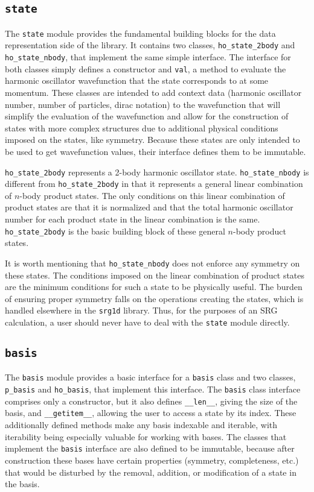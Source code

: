 \subsection{\texttt{state}}

The \texttt{state} module provides the fundamental building blocks for the data representation side of the library. It contains two classes, \texttt{ho\_state\_2body} and \texttt{ho\_state\_nbody}, that implement the same simple interface. The interface for both classes simply defines a constructor and \texttt{val}, a method to evaluate the harmonic oscillator wavefunction that the state corresponds to at some momentum. These classes are intended to add context data (harmonic oscillator number, number of particles, dirac notation) to the wavefunction that will simplify the evaluation of the wavefunction and allow for the construction of states with more complex structures due to additional physical conditions imposed on the states, like symmetry. Because these states are only intended to be used to get wavefunction values, their interface defines them to be immutable.

\texttt{ho\_state\_2body} represents a 2-body harmonic oscillator state. \texttt{ho\_state\_nbody} is different from \texttt{ho\_state\_2body} in that it represents a general linear combination of $n$-body product states. The only conditions on this linear combination of product states are that it is normalized and that the total harmonic oscillator number for each product state in the linear combination is the same. \texttt{ho\_state\_2body} is the basic building block of these general $n$-body product states.

It is worth mentioning that \texttt{ho\_state\_nbody} does not enforce any symmetry on these states. The conditions imposed on the linear combination of product states are the minimum conditions for such a state to be physically useful. The burden of ensuring proper symmetry falls on the operations creating the states, which is handled elsewhere in the \texttt{srg1d} library. Thus, for the purposes of an SRG calculation, a user should never have to deal with the \texttt{state} module directly.

\subsection{\texttt{basis}}

The \texttt{basis} module provides a basic interface for a \texttt{basis} class and two classes, \texttt{p\_basis} and \texttt{ho\_basis}, that implement this interface. The \texttt{basis} class interface comprises only a constructor, but it also defines \texttt{\_\_len\_\_}, giving the size of the basis, and \texttt{\_\_getitem\_\_}, allowing the user to access a state by its index. These additionally defined methods make any basis indexable and iterable, with iterability being especially valuable for working with bases. The classes that implement the \texttt{basis} interface are also defined to be immutable, because after construction these bases have certain properties (symmetry, completeness, etc.) that would be disturbed by the removal, addition, or modification of a state in the basis.

